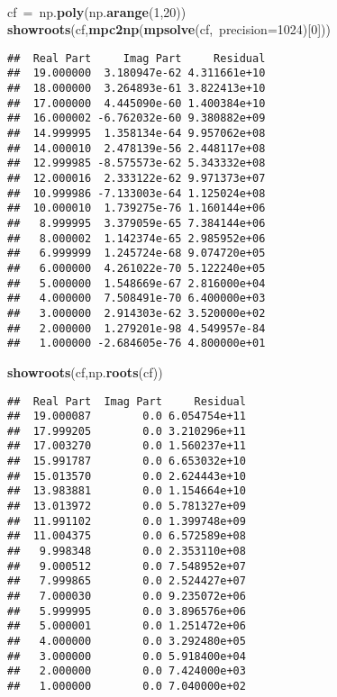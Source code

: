 \documentclass{article}\usepackage[]{graphicx}\usepackage[dvipsnames,table]{xcolor}
\makeatletter
\newcommand{\hlnum}[1]{\textcolor[rgb]{0.686,0.059,0.569}{#1}}%
\newcommand{\hlopt}[1]{\textcolor[rgb]{0,0,0}{#1}}%
\newcommand{\hldef}[1]{\textcolor[rgb]{0.345,0.345,0.345}{#1}}%
\newcommand{\hlkwd}[1]{\textcolor[rgb]{0.737,0.353,0.396}{\textbf{#1}}}%
\newenvironment{kframe}{%
 \def\at@end@of@kframe{}%
 \ifinner\ifhmode%
  \def\at@end@of@kframe{\end{minipage}}%
  \begin{minipage}{\columnwidth}%
 \fi\fi%
 \def\FrameCommand##1{\hskip\@totalleftmargin \hskip-\fboxsep
 \colorbox{shadecolor}{##1}\hskip-\fboxsep
     \hskip-\linewidth \hskip-\@totalleftmargin \hskip\columnwidth}%
 \MakeFramed {\advance\hsize-\width
   \@totalleftmargin\z@ \linewidth\hsize
   \@setminipage}}%
 {\par\unskip\endMakeFramed%
 \at@end@of@kframe}
\newenvironment{knitrout}{}{} %
\makeatother
\begin{document}
\begin{center}
\begin{minipage}[m]{18cm}
\begin{knitrout}
\begin{kframe}
\hldef{}\hspace*{\fill}\\
\hldef{cf\ }\hlopt{=\ }\hldef{np}\hlopt{.}\hldef{}\hlkwd{poly}\hldef{}\hlopt{(}\hldef{np}\hlopt{.}\hldef{}\hlkwd{arange}\hldef{}\hlopt{(}\hldef{}\hlnum{1}\hldef{}\hlopt{,}\hldef{}\hlnum{20}\hldef{}\hlopt{))\ }\hldef{}\hspace*{\fill}\\
\hldef{}\hlkwd{show\textunderscore roots}\hldef{}\hlopt{(}\hldef{cf}\hlopt{,}\hldef{}\hlkwd{mpc2np}\hldef{}\hlopt{(}\hldef{}\hlkwd{mpsolve}\hldef{}\hlopt{(}\hldef{cf}\hlopt{,\ }\hldef{precision}\hlopt{=}\hldef{}\hlnum{1024}\hldef{}\hlopt{){[}}\hldef{}\hlnum{0}\hldef{}\hlopt{{]}))}\hldef{}\hspace*{\fill}
\mbox{}
\normalfont
\begin{verbatim}
##  Real Part     Imag Part     Residual
##  19.000000  3.180947e-62 4.311661e+10
##  18.000000  3.264893e-61 3.822413e+10
##  17.000000  4.445090e-60 1.400384e+10
##  16.000002 -6.762032e-60 9.380882e+09
##  14.999995  1.358134e-64 9.957062e+08
##  14.000010  2.478139e-56 2.448117e+08
##  12.999985 -8.575573e-62 5.343332e+08
##  12.000016  2.333122e-62 9.971373e+07
##  10.999986 -7.133003e-64 1.125024e+08
##  10.000010  1.739275e-76 1.160144e+06
##   8.999995  3.379059e-65 7.384144e+06
##   8.000002  1.142374e-65 2.985952e+06
##   6.999999  1.245724e-68 9.074720e+05
##   6.000000  4.261022e-70 5.122240e+05
##   5.000000  1.548669e-67 2.816000e+04
##   4.000000  7.508491e-70 6.400000e+03
##   3.000000  2.914303e-62 3.520000e+02
##   2.000000  1.279201e-98 4.549957e-84
##   1.000000 -2.684605e-76 4.800000e+01
\end{verbatim}
\noindent
\ttfamily
\hldef{}\hlkwd{show\textunderscore roots}\hldef{}\hlopt{(}\hldef{cf}\hlopt{,}\hldef{np}\hlopt{.}\hldef{}\hlkwd{roots}\hldef{}\hlopt{(}\hldef{cf}\hlopt{))}\hldef{}\hspace*{\fill}
\mbox{}
\normalfont
\begin{verbatim}
##  Real Part  Imag Part     Residual
##  19.000087        0.0 6.054754e+11
##  17.999205        0.0 3.210296e+11
##  17.003270        0.0 1.560237e+11
##  15.991787        0.0 6.653032e+10
##  15.013570        0.0 2.624443e+10
##  13.983881        0.0 1.154664e+10
##  13.013972        0.0 5.781327e+09
##  11.991102        0.0 1.399748e+09
##  11.004375        0.0 6.572589e+08
##   9.998348        0.0 2.353110e+08
##   9.000512        0.0 7.548952e+07
##   7.999865        0.0 2.524427e+07
##   7.000030        0.0 9.235072e+06
##   5.999995        0.0 3.896576e+06
##   5.000001        0.0 1.251472e+06
##   4.000000        0.0 3.292480e+05
##   3.000000        0.0 5.918400e+04
##   2.000000        0.0 7.424000e+03
##   1.000000        0.0 7.040000e+02
\end{verbatim}
\end{kframe}
\end{knitrout}
\end{minipage}
\end{center}
\end{document}
